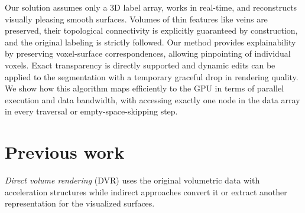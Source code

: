 \documentclass[journal]{vgtc}                     %
\begin{document}
Our solution assumes only a 3D label array, works in real-time, and reconstructs visually pleasing smooth surfaces. Volumes of thin features like veins are preserved,
their topological connectivity is explicitly guaranteed by construction, and the original labeling is strictly followed. Our method provides explainability by preserving voxel-surface correspondences, allowing pinpointing of individual voxels. Exact transparency is directly supported and dynamic edits can be applied to the segmentation with a temporary graceful drop in rendering quality. We show how this algorithm maps efficiently to the GPU in terms of parallel execution and data bandwidth, with accessing exactly one node in the data array in every traversal or empty-space-skipping step.

\section{Previous work}
\emph{Direct volume rendering} (DVR) uses the original volumetric data with acceleration structures while indirect approaches convert it or extract another representation for the visualized surfaces.
\end{document}
